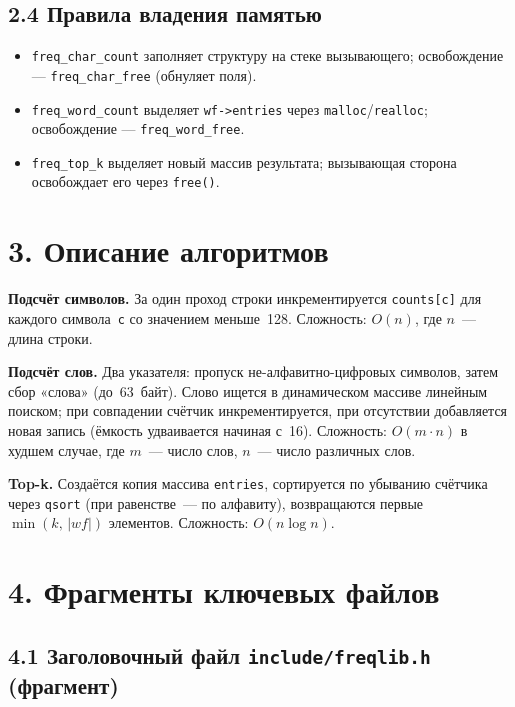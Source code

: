 \subsection*{2.4 Правила владения памятью}

\begin{itemize}
    \item \texttt{freq\_char\_count} заполняет структуру на стеке вызывающего;
          освобождение — \texttt{freq\_char\_free} (обнуляет поля).
    \item \texttt{freq\_word\_count} выделяет \texttt{wf->entries} через
          \texttt{malloc}/\texttt{realloc};
          освобождение — \texttt{freq\_word\_free}.
    \item \texttt{freq\_top\_k} выделяет новый массив результата;
          вызывающая сторона освобождает его через \texttt{free()}.
\end{itemize}

\HRule

\section*{3. Описание алгоритмов}

\textbf{Подсчёт символов.}
За один проход строки инкрементируется \texttt{counts[c]} для каждого
символа~\texttt{c} со значением меньше~128.
Сложность: $O(n)$, где $n$~--- длина строки.

\textbf{Подсчёт слов.}
Два указателя: пропуск не-алфавитно-цифровых символов,
затем сбор «слова» (до~63~байт).
Слово ищется в динамическом массиве линейным поиском;
при совпадении счётчик инкрементируется,
при отсутствии добавляется новая запись
(ёмкость удваивается начиная с~16).
Сложность: $O(m \cdot n)$ в худшем случае,
где $m$~--- число слов, $n$~--- число различных слов.

\textbf{Top-k.}
Создаётся копия массива \texttt{entries}, сортируется по убыванию
счётчика через \texttt{qsort} (при равенстве~--- по алфавиту),
возвращаются первые $\min(k,\,|\textit{wf}|)$ элементов.
Сложность: $O(n \log n)$.

\HRule

\section*{4. Фрагменты ключевых файлов}

\subsection*{4.1 Заголовочный файл \texttt{include/freqlib.h} (фрагмент)}

